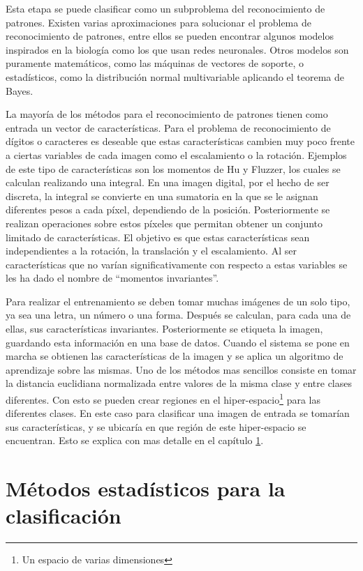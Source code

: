 \documentclass[a4paper, 11pt, oneside]{report}
\begin{document}
Esta etapa se puede clasificar como un subproblema del reconocimiento de patrones. Existen varias aproximaciones para solucionar el problema de reconocimiento de patrones, entre ellos se pueden encontrar algunos modelos inspirados en la biología como los que usan redes neuronales. Otros modelos son puramente matemáticos, como las máquinas de vectores de soporte, o estadísticos, como la distribución normal multivariable aplicando el teorema de Bayes.

La  mayoría de los métodos para el reconocimiento de patrones tienen como entrada un vector de características. Para el problema de reconocimiento de dígitos o caracteres es deseable que estas características cambien muy poco frente a ciertas variables de cada imagen como el escalamiento o la rotación. Ejemplos de este tipo de características son los momentos de Hu y Fluzzer, los cuales se calculan realizando una integral. En una imagen digital, por el hecho de ser discreta, la integral se convierte en una sumatoria en la que se le asignan diferentes pesos a cada píxel, dependiendo de la posición. Posteriormente se realizan operaciones sobre estos píxeles que permitan obtener un conjunto limitado de características. El objetivo es que estas características sean independientes a la rotación, la translación y el escalamiento. Al ser características que no varían significativamente con respecto a estas variables se les ha dado el nombre de ``momentos invariantes''.

Para realizar el entrenamiento se deben tomar muchas imágenes de un solo tipo, ya sea una letra, un número o una forma. Después se calculan, para cada una de ellas, sus características invariantes. Posteriormente se etiqueta la imagen, guardando esta información en una base de datos. Cuando el sistema se pone en marcha se obtienen las características de la imagen y se aplica un algoritmo de aprendizaje sobre las mismas. Uno de los métodos mas sencillos consiste en tomar la distancia euclidiana normalizada entre valores de la misma clase y entre clases diferentes. Con esto se pueden crear regiones en el hiper-espacio\footnote{Un espacio de varias dimensiones} para las diferentes clases. En este caso para clasificar una imagen de entrada se tomarían sus características, y se ubicaría en que región de este hiper-espacio se encuentran. Esto se explica con mas detalle en el capítulo \ref{chap:ml}.
    
\chapter{Métodos estadísticos para la clasificación}
\label{chap:ml}
\end{document}
